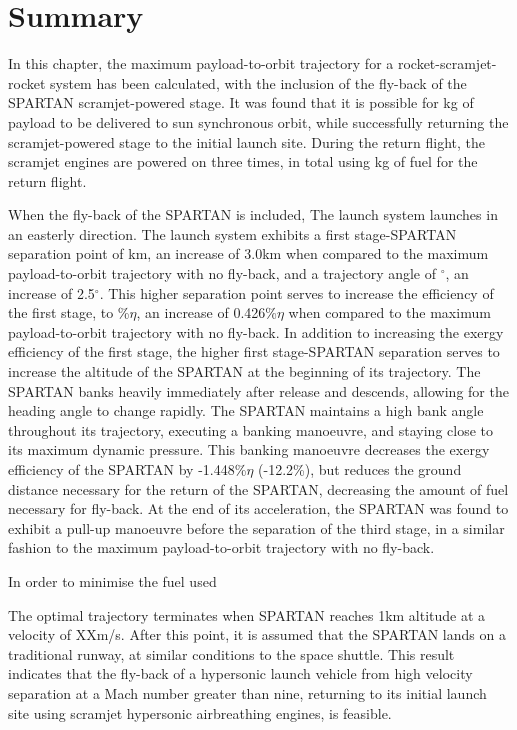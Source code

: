 \section{Summary}

In this chapter, the maximum payload-to-orbit trajectory for a rocket-scramjet-rocket system has been calculated, with the inclusion of the fly-back of the SPARTAN scramjet-powered stage. It was found that it is possible for \PayloadToOrbitStandard kg of payload to be delivered to sun synchronous orbit, while successfully returning the scramjet-powered stage to the initial launch site. 
During the return flight, the scramjet engines are powered on three times, in total using \returnFuelStandard kg of fuel for the return flight.

When the fly-back of the SPARTAN is included, The launch system launches in an easterly direction. 
The  launch system exhibits a first stage-SPARTAN separation point of \firstsecondSeparationAltStandard km, an increase of 3.0km when compared to the maximum payload-to-orbit trajectory with no fly-back, and a trajectory angle of \firstsecondSeparationgammaStandard $^\circ$, an increase of 2.5$^\circ$. This higher separation point serves to increase the efficiency of the first stage, to \firstExergyEffStandard \%$\eta$, an increase of 0.426\%$\eta$ when compared to the maximum payload-to-orbit trajectory with no fly-back.
In addition to increasing the exergy efficiency of the first stage, the higher first stage-SPARTAN separation serves to increase the altitude of the SPARTAN at the beginning of its trajectory. The SPARTAN banks heavily immediately after release and descends, allowing for the heading angle to change rapidly. The SPARTAN maintains a high bank angle throughout its trajectory, executing a banking manoeuvre, and staying close to its maximum dynamic pressure. 
This banking manoeuvre decreases the exergy efficiency of the SPARTAN by -1.448\%$\eta$ (-12.2\%), but reduces the ground distance necessary for the return of the SPARTAN, decreasing the amount of fuel necessary for fly-back. 
At the end of its acceleration, the SPARTAN was found to exhibit a pull-up manoeuvre before the separation of the third stage, in a similar fashion to the maximum payload-to-orbit trajectory with no fly-back. 



 In order to minimise the fuel used
 
 The optimal trajectory terminates when SPARTAN reaches 1km altitude at a velocity of XXm/s. After this point, it is assumed that the SPARTAN lands on a traditional runway, at similar conditions to the space shuttle.  
This result indicates that the fly-back of a hypersonic launch vehicle from high velocity separation at a Mach number greater than nine, returning to its initial launch site using scramjet hypersonic airbreathing engines, is feasible.  



